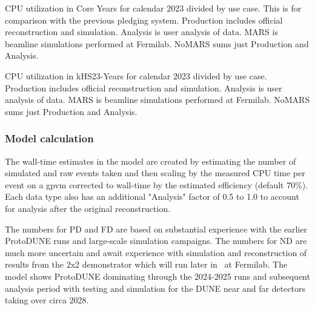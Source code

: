 \documentclass[12pt]{article}
\begin{document}
\begin{table}[h]
\centering{}
\caption{CPU utilization in Core Years  for calendar 2023 divided by use case.  This is for comparison with the previous pledging system.    Production includes  official reconstruction and simulation. Analysis is user analysis of data.  MARS is beamline simulations performed at Fermilab.  NoMARS sums just Production and Analysis.  }
\label{tab:CPUCores}
\end{table}

\begin{table}[h]
\centering{}
\caption{CPU utilization in kHS23-Years for calendar 2023 divided by use case.   Production includes official reconstruction and simulation. Analysis is user analysis of data.  MARS is beamline simulations performed at Fermilab.  NoMARS sums just Production and Analysis. }
\label{tab:CPUusage}
\end{table}


\subsubsection{Model calculation}
The wall-time estimates in the model are created by estimating the number of simulated and raw events taken and then scaling by the measured CPU time per event on a gpvm corrected to wall-time by the estimated efficiency (default 70\%).  Each data type also has an additional "Analysis" factor of 0.5 to 1.0  to account for analysis after the original reconstruction.  

The numbers for PD and FD are based on substantial experience with the earlier ProtoDUNE runs and  large-scale simulation campaigns.  The numbers for ND are much more uncertain and await experience with  simulation and reconstruction of results from the 2x2 demonstrator which will run later in \ThisYear\ at Fermilab. The model shows ProtoDUNE dominating through the 2024-2025 runs and subsequent analysis period with  testing and simulation for the DUNE near and far detectors taking over circa 2028. 


\end{document}
